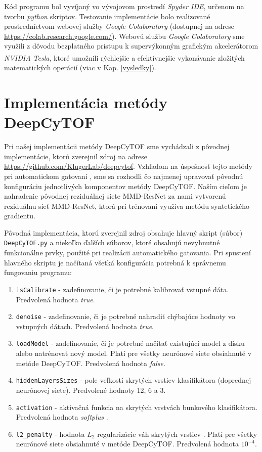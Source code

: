 Kód programu bol vyvíjaný vo vývojovom prostredí \textit{Spyder IDE}, určenom na tvorbu \textit{python} skriptov. Testovanie implementácie bolo realizované prostredníctvom webovej služby \textit{Google Colaboratory} (dostupnej na adrese \url{https://colab.research.google.com/}). Webovú službu \textit{Google Colaboratory} sme využili z dôvodu bezplatného prístupu k supervýkonným grafickým akcelerátorom \textit{NVIDIA\textsuperscript{\textregistered} Tesla}, ktoré umožnili rýchlejšie a efektívnejšie vykonávanie zložitých matematických operácií (viac v Kap. \ref{vysledky}). 

\section{Implementácia metódy DeepCyTOF}
\label{impl_deepcytof}

Pri našej implementácii metódy DeepCyTOF sme vychádzali z pôvodnej implementácie, ktorú zverejnil zdroj \cite{Li2017} na adrese \url{https://github.com/KlugerLab/deepcytof}. Vzhľadom na úspešnosť tejto metódy pri automatickom gatovaní \cite{Li2016, Li2017}, sme sa rozhodli čo najmenej upravovať pôvodnú konfiguráciu jednotlivých komponentov metódy DeepCyTOF. Naším cieľom je nahradenie pôvodnej reziduálnej siete MMD-ResNet za nami vytvorenú reziduálnu sieť MMD-ResNet, ktorá pri trénovaní využíva metódu syntetického gradientu.

\begin{sloppypar}
Pôvodná implementácia, ktorú zverejnil zdroj \cite{Li2017} obsahuje hlavný skript (súbor) \texttt{DeepCyTOF.py} a niekoľko ďalších súborov, ktoré obsahujú nevyhnutné funkcionálne prvky, použité pri realizácii automatického gatovania. Pri spustení hlavného skriptu je načítaná všetká konfigurácia potrebná k správnemu fungovaniu programu:
\end{sloppypar}
\begin{enumerate}
    \item \texttt{isCalibrate} - zadefinovanie, či je potrebné kalibrovať vstupné dáta. Predvolená hodnota \textit{true}.
    \item \texttt{denoise} - zadefinovanie, či je potrebné nahradiť chýbajúce hodnoty vo vstupných dátach. Predvolená hodnota \textit{true}.
    \item \texttt{loadModel} - zadefinovanie, či je potrebné načítať existujúci model z disku alebo natrénovať nový model. Platí pre všetky neurónové siete obsiahnuté v metóde DeepCyTOF. Predvolená hodnota \textit{false}.
    \item \texttt{hiddenLayersSizes} - pole veľkostí skrytých vrstiev klasifikátora (doprednej neurónovej siete). Predvolené hodnoty 12, 6 a 3.
    \item \texttt{activation} - aktivačná funkcia na skrytých vrstvách bunkového klasifikátora. Predvolená hodnota \textit{softplus} \cite{Goh1995}.
    \item \texttt{l2_penalty} - hodnota \textit{$L_2$} regularizácie váh skrytých vrstiev \cite{Goh1995}. Platí pre všetky neurónové siete obsiahnuté v metóde DeepCyTOF. Predvolená hodnota $10^{-4}$.
\end{enumerate}

